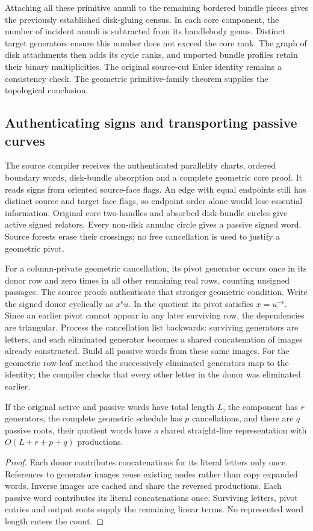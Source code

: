 Attaching all these primitive annuli to the remaining bordered bundle
pieces gives the previously established disk-gluing census.  In each
core component, the number of incident annuli is subtracted from its
handlebody genus.  Distinct target generators ensure this number does
not exceed the core rank.  The graph of disk attachments then adds its
cycle ranks, and unported bundle profiles retain their binary
multiplicities.  The original source-cut Euler identity remains a
consistency check.  The geometric primitive-family theorem supplies the
topological conclusion.

\subsection{Authenticating signs and transporting passive curves}

The source compiler receives the authenticated parallelity charts,
ordered boundary words, disk-bundle absorption and a complete geometric
core proof.  It reads signs from oriented source-face flags.  An edge
with equal endpoints still has distinct source and target face flags,
so endpoint order alone would lose essential information.  Original
core two-handles and absorbed disk-bundle circles give active signed
relators.  Every non-disk annular circle gives a passive signed word.
Source forests erase their crossings; no free cancellation is used to
justify a geometric pivot.

For a column-private geometric cancellation, its pivot generator occurs
once in its donor row and zero times in all other remaining real rows,
counting unsigned passages.  The source proofs authenticate that stronger
geometric condition.  Write the signed donor cyclically as
$x^\epsilon u$.  In the quotient its pivot satisfies $x=u^{-\epsilon}$.
Since an earlier pivot cannot appear in any later surviving row, the
dependencies are triangular.  Process the cancellation list backwards:
surviving generators are letters, and each eliminated generator becomes
a shared concatenation of images already constructed.  Build all passive
words from these same images.  For the geometric row-leaf method the
successively eliminated generators map to the identity; the compiler
checks that every other letter in the donor was eliminated earlier.

\begin{proposition}
If the original active and passive words have total length $L$, the
component has $r$ generators, the complete geometric schedule has $p$
cancellations, and there are $q$ passive roots, their quotient words have
a shared straight-line representation with $O(L+r+p+q)$ productions.
\end{proposition}
\begin{proof}
Each donor contributes concatenations for its literal letters only once.
References to generator images reuse existing nodes rather than copy
expanded words.  Inverse images are cached and share the reversed
productions.  Each passive word contributes its literal concatenations
once.  Surviving letters, pivot entries and output roots supply the
remaining linear terms.  No represented word length enters the count.
\end{proof}


